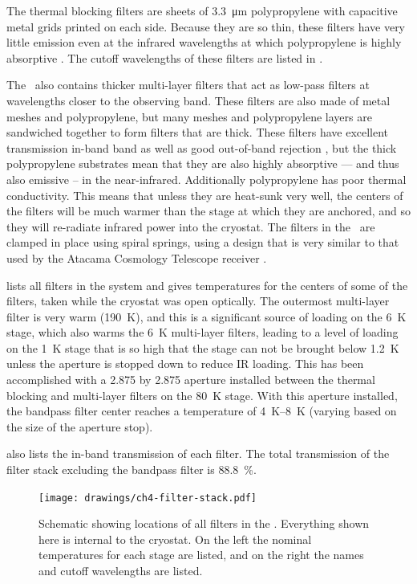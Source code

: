 The thermal blocking filters are sheets of \SI{3.3}{\um} polypropylene with capacitive metal grids printed on each side.
Because they are so thin, these filters have very little emission even at the infrared wavelengths at which polypropylene is highly absorptive \cite{tucker_thermal_2006}.
The cutoff wavelengths of these filters are listed in .

The \Imager\ also contains thicker multi-layer filters that act as low-pass filters at wavelengths closer to the observing band.
These filters are also made of metal meshes and polypropylene, but many meshes and polypropylene layers are sandwiched together to form filters that are  thick.
These filters have excellent transmission in-band band as well as good out-of-band rejection \cite{ade_review_2006}, but the thick polypropylene substrates mean that they are also highly absorptive --- and thus also emissive -- in the near-infrared.
Additionally polypropylene has poor thermal conductivity.
This means that unless they are heat-sunk very well, the centers of the filters will be much warmer than the stage at which they are anchored, and so they will re-radiate infrared power into the cryostat.
The filters in the \Imager\ are clamped in place using spiral springs, using a design that is very similar to that used by the Atacama Cosmology Telescope receiver \cite{swetz_overview_2011}.

 lists all filters in the system and gives temperatures for the centers of some of the filters, taken while the cryostat was open optically.
The outermost multi-layer filter is very warm (\SI{190}{\K}), and this is a significant source of loading on the \SI{6}{\K} stage, which also warms the \SI{6}{\K} multi-layer filters, leading to a level of loading on the \SI{1}{\K} stage that is so high that the stage can not be brought below \SI{1.2}{\K} unless the aperture is stopped down to reduce IR loading.
This has been accomplished with a \SI{2.875}{\in} by \SI{2.875}{\in} aperture installed between the thermal blocking and multi-layer filters on the \SI{80}{\K} stage.
With this aperture installed, the bandpass filter center reaches a temperature of \SIrange{4}{8}{\K} (varying based on the size of the aperture stop).

 also lists the in-band transmission of each filter.
The total transmission of the filter stack excluding the bandpass filter is \SI{88.8}{\percent}.

\begin{figure}
\centering
\texttt{[image: drawings/ch4-filter-stack.pdf]}
\caption[Schematic showing locations of all filters in the \Imager]{
  Schematic showing locations of all filters in the \Imager.
  Everything shown here is internal to the cryostat.
  On the left the nominal temperatures for each stage are listed, and on the right the names and cutoff wavelengths are listed.
}
\label{fig:ch4-filter-stack}
\end{figure}

